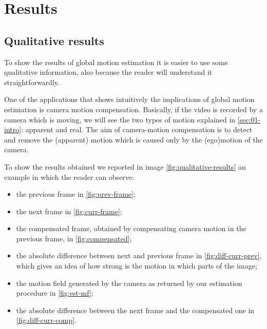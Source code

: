 \section{Results}
\label{sec:04-results}

\subsection{Qualitative results}

To show the results of global motion estimation it is easier to use some qualitative information, also because the reader will understand it straightforwardly.

One of the applications that shows intuitively the implications of global motion estimation is camera motion compensation. 
Basically, if the video is recorded by a camera which is moving, we will see the two types of motion explained in \cref{sec:01-intro}: apparent and real. The aim of camera-motion compensation is to detect and remove the (apparent) motion which is caused only by the (ego)motion of the camera.

To show the results obtained we reported in image \cref{fig:qualitative-results} an example in which the reader can observe:
\begin{itemize}
    \item the previous frame in \cref{fig:prev-frame};
    \item the next frame in \cref{fig:curr-frame};
    \item the compensated frame, obtained by compensating camera motion in the previous frame, in \cref{fig:compensated};
    \item the absolute difference between next and previous frame in \cref{fig:diff-curr-prev}, which gives an idea of how strong is the motion in which parts of the image;
    \item the motion field generated by the camera as returned by our estimation procedure in \cref{fig:est-mf};
    \item the absolute difference between the next frame and the compensated one in \cref{fig:diff-curr-comp}.
\end{itemize}


